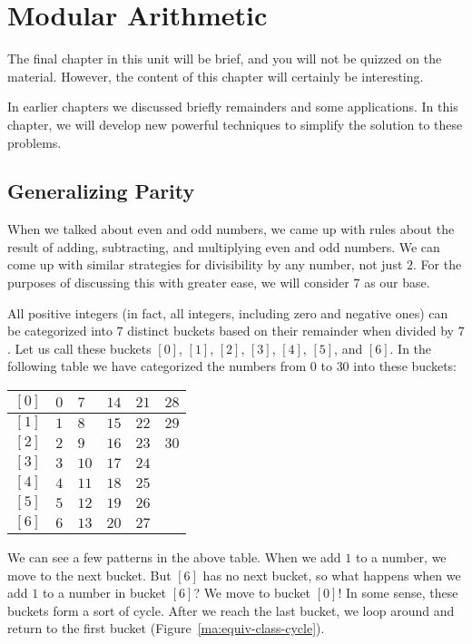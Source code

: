 \documentclass[a4paper,10pt]{report}
\begin{document}
\chapter{Modular Arithmetic}

The final chapter in this unit will be brief, and you will not be quizzed on the
material. However, the content of this chapter will certainly be interesting.

In earlier chapters we discussed briefly remainders and some applications. In
this chapter, we will develop new powerful techniques to simplify the solution
to these problems.

\section{Generalizing Parity}

When we talked about even and odd numbers, we came up with rules about the
result of adding, subtracting, and multiplying even and odd numbers. We can come
up with similar strategies for divisibility by any number, not just $2$. For the
purposes of discussing this with greater ease, we will consider $7$ as our base.

All positive integers (in fact, all integers, including zero and negative ones)
can be categorized into $7$ distinct buckets based on their remainder when
divided by $7$. Let us call these buckets $[0]$, $[1]$, $[2]$, $[3]$, $[4]$,
$[5]$, and $[6]$. In the following table we have categorized the numbers from
$0$ to $30$ into these buckets:

\begin{center}
 \begin{tabular}{|c|lllll|}
  \hline
  $[0]$ & $0$ & $7$ & $14$ & $21$ & $28$ \\ \hline
  $[1]$ & $1$ & $8$ & $15$ & $22$ & $29$ \\ \hline
  $[2]$ & $2$ & $9$ & $16$ & $23$ & $30$ \\ \hline
  $[3]$ & $3$ & $10$ & $17$ & $24$ & \\ \hline
  $[4]$ & $4$ & $11$ & $18$ & $25$ & \\ \hline
  $[5]$ & $5$ & $12$ & $19$ & $26$ & \\ \hline
  $[6]$ & $6$ & $13$ & $20$ & $27$ & \\ \hline
 \end{tabular}
\end{center}

We can see a few patterns in the above table. When we add $1$ to a number, we
move to the next bucket. But $[6]$ has no next bucket, so what happens when we
add $1$ to a number in bucket $[6]$? We move to bucket $[0]$! In some sense,
these buckets form a sort of cycle. After we reach the last bucket, we loop
around and return to the first bucket (Figure~\ref{ma:equiv-class-cycle}).
\end{document}

